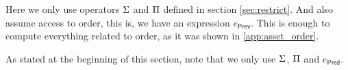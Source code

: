 
Here we only use operators $\Sigma$ and $\Pi$ defined in section \ref{sec:restrict}. 
And also assume access to order, this is, we have an expression $e_{\mathsf{Prev}}$. This is enough to 
compute everything related to order, as it was shown in \ref{app:asset_order}.

As stated at the beginning of this section, note that we only use $\Sigma$, $\Pi$ and $e_{\mathsf{Pred}}$.





